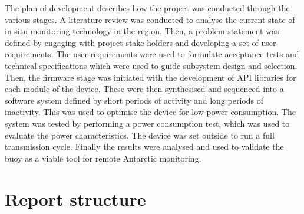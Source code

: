 The plan of development describes how the project was conducted through the various stages. A literature review was conducted to analyse the current state of in situ monitoring technology in the region. Then, a problem statement was defined by engaging with project stake holders and developing a set of user requirements. The user requirements were used to formulate acceptance tests and technical specifications which were used to guide subsystem design and selection. Then, the firmware stage was initiated with the development of API libraries for each module of the device. These were then synthesised and sequenced into a software system defined by short periods of activity and long periods of inactivity. This was used to optimise the device for low power consumption. The system was tested by performing a power consumption test, which was used to evaluate the power characteristics. The device was set outside to run a full transmission cycle. Finally the results were analysed and used to validate the buoy as a viable tool for remote Antarctic monitoring.
\section{Report structure}

